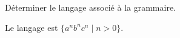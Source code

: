 \begin{exercice}
  \begin{questions}
  \item Déterminer le langage associé à la grammaire.
  \end{questions}
  \begin{corrections}
    Le langage est $\{a^nb^nc^n \mid  n > 0\}$.
  \end{corrections}
  
\end{exercice}

\endgroup
\endinput
